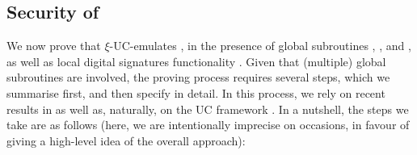 \subsection{Security of \RealPKIDIDAtala}
\label{ssec:sec-didatala}

We now prove that \RealPKIDIDAtala $\xi$-UC-emulates \IdealGPKIDID, in the
presence of global subroutines \IdealGclock, \IdealGRO, and \IdealGdledger,
as well as local digital signatures functionality \IdealFSig.
Given that (multiple) global subroutines are involved, the proving process
requires several steps, which we summarise first, and then specify in detail. In
this process, we rely on recent results in \cite{bch+20,bhz21} as well as,
naturally, on the UC framework \cite{canetti00}. In a nutshell, the steps we
take are as follows (here, we are intentionally imprecise on occasions, in
favour of giving a high-level idea of the overall approach):

